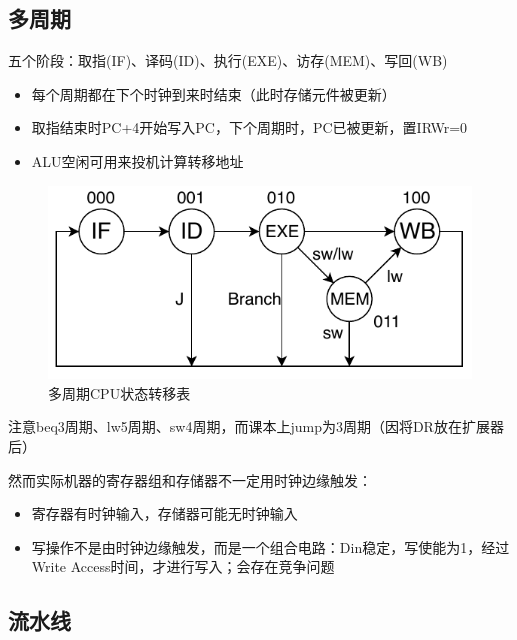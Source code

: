\subsection{多周期}
五个阶段：取指(IF)、译码(ID)、执行(EXE)、访存(MEM)、写回(WB)
\begin{itemize}
	\item 每个周期都在下个时钟到来时结束（此时存储元件被更新）
	\item 取指结束时PC+4开始写入PC，下个周期时，PC已被更新，置IRWr=0
	\item ALU空闲可用来投机计算转移地址
\end{itemize}
\begin{figure}[htbp]
\centering
\includegraphics[width=0.5\linewidth]{fig/Datapath-Multi-cycle.pdf}
\caption{多周期CPU状态转移表}
\end{figure}
\par 注意beq3周期、lw5周期、sw4周期，而课本上jump为3周期（因将DR放在扩展器后）
\par 然而实际机器的寄存器组和存储器不一定用时钟边缘触发：
\begin{itemize}
	\item 寄存器有时钟输入，存储器可能无时钟输入
	\item 写操作不是由时钟边缘触发，而是一个组合电路：Din稳定，写使能为1，经过Write Access时间，才进行写入；会存在竞争问题
\end{itemize}

\subsection{流水线}
